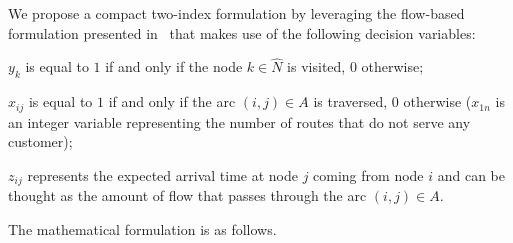 \documentclass[11pt]{article}
\theoremstyle{definition}
\begin{document}
%
%
We propose a compact two-index formulation by leveraging the flow-based formulation presented in~\cite{Guastalla2025} that makes use of the following decision variables:
%
\begin{inparadesc}
\item$y_{k}$ is equal to $1$ if and only if the node $k \in \hat{N}$ is visited, $0$ otherwise;
\item$x_{ij}$ is equal to $1$ if and only if the arc $(i,j) \in A$ is traversed, $0$ otherwise ($x_{1n}$ is an integer variable representing the number of routes that do not serve any customer);
\item $z_{ij}$ represents the expected arrival time at node $j$ coming from node $i$ and can be thought as the amount of flow that passes through the arc $(i,j) \in A$.
\end{inparadesc}
%
The mathematical formulation is as follows.

\end{document}
